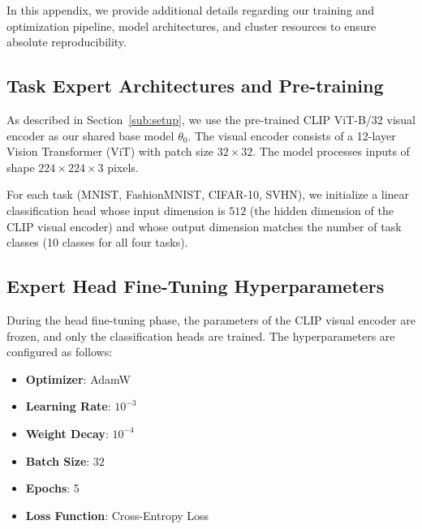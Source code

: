 \documentclass{article}
\theoremstyle{plain}
\theoremstyle{definition}
\theoremstyle{remark}
\begin{document}
In this appendix, we provide additional details regarding our training and optimization pipeline, model architectures, and cluster resources to ensure absolute reproducibility.

\subsection{Task Expert Architectures and Pre-training}
As described in Section~\ref{sub:setup}, we use the pre-trained CLIP ViT-B/32 visual encoder \cite{clip} as our shared base model $\theta_0$. The visual encoder consists of a 12-layer Vision Transformer (ViT) with patch size $32 \times 32$. The model processes inputs of shape $224 \times 224 \times 3$ pixels.

For each task (MNIST, FashionMNIST, CIFAR-10, SVHN), we initialize a linear classification head whose input dimension is $512$ (the hidden dimension of the CLIP visual encoder) and whose output dimension matches the number of task classes (10 classes for all four tasks).

\subsection{Expert Head Fine-Tuning Hyperparameters}
During the head fine-tuning phase, the parameters of the CLIP visual encoder are frozen, and only the classification heads are trained. The hyperparameters are configured as follows:
\begin{itemize}
    \item \textbf{Optimizer}: AdamW \cite{adamw}
    \item \textbf{Learning Rate}: $10^{-3}$
    \item \textbf{Weight Decay}: $10^{-4}$
    \item \textbf{Batch Size}: $32$
    \item \textbf{Epochs}: 5
    \item \textbf{Loss Function}: Cross-Entropy Loss
\end{itemize}
\end{document}

